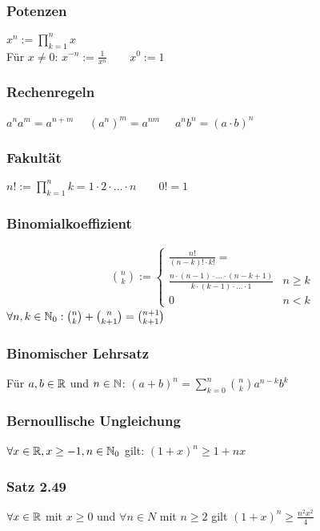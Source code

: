 \subsubsection*{Potenzen}
$x^n := \prod\limits_{k = 1}^n x$\\
Für $x \neq 0$: 
$x^{-n} := \frac{1}{x^n} \quad\quad x^0 := 1$
\subsubsection*{Rechenregeln}
$a^n a^m = a^{n + m}\quad$
$(a^n)^m = a^{nm}\quad$
$a^n b^n = (a \cdot b)^n$
\subsubsection*{Fakultät}
$n! := \prod\limits_{k=1}^n k = 1 \cdot 2 \cdot ... \cdot n \quad\quad 0! = 1$
\subsubsection*{Binomialkoeffizient}
\begin{align*}
    &\binom{n}{k} := \begin{cases}
    \frac{n!}{(n - k)! \cdot k!} = \\
    \frac{n \cdot (n-1)\cdot ... \cdot (n-k +1)}{k \cdot (k-1) \cdot ... \cdot 1} & n\geq k\\
    0 & n < k
    \end{cases}
\end{align*}
$\forall n, k \in \mathbb N_0: \binom{n}{k} + \binom{n}{k+1} = \binom{n +1}{k+1}$
\subsubsection*{Binomischer Lehrsatz}
Für $a, b \in \mathbb R$ und $n \in \mathbb N$:
$(a + b)^n = \sum\limits_{k = 0}^n \binom{n}{k} a^{n - k}b^k$
\subsubsection*{Bernoullische Ungleichung}
$\forall x \in \mathbb R, x \geq -1, n \in \mathbb N_0$ gilt:
$(1 + x)^n \geq 1 + nx$
\subsubsection*{Satz 2.49}
$\forall x \in \mathbb R$ mit $x \geq 0$ und $\forall n \in N$ mit $n \geq 2$ gilt
$(1 + x)^n \geq \frac{n^2 x^2}{4}$